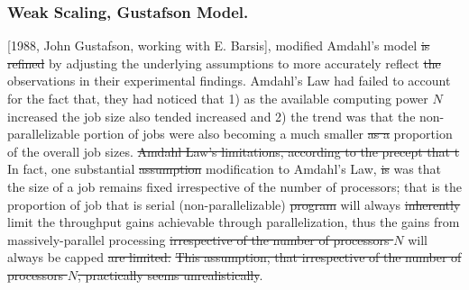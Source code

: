 \documentclass[10pt]{article}[draft]
\begin{document}






\subsubsection{Weak Scaling, Gustafson Model.}
[1988, John Gustafson, working with E. Barsis], modified  Amdahl's model  \st{is refined} by adjusting the underlying assumptions to more accurately reflect \st{the} observations in their experimental findings. Amdahl's Law had failed to account for the fact that, they had noticed that 1) as the available computing power $N$ increased the job size also tended increased and 2) the trend was that the non-parallelizable portion of jobs were also becoming a much smaller \st{as a} proportion of the overall job sizes. \st{Amdahl Law's limitations, according to the precept that t} In fact, one substantial \st{assumption} modification to Amdahl's Law, \st{is} was that the size of a job remains fixed irrespective of the number of processors; that is the proportion of job that is serial (non-parallelizable) \st{program} will always \st{inherently} limit the throughput gains achievable through parallelization, thus the gains from massively-parallel  processing \st{irrespective of the number of processors $N$} will always be capped \st{are limited.}  \st{This assumption, that irrespective of the number of processors $N$, practically seems unrealistically}. 
\end{document}
